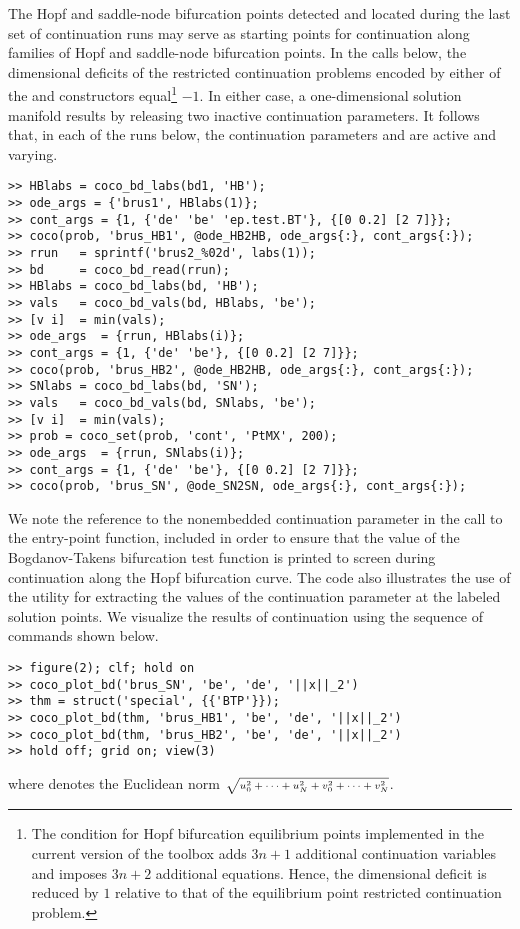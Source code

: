 The Hopf and saddle-node bifurcation points detected and located during the last set of continuation runs may serve as starting points for continuation along families of Hopf and saddle-node bifurcation points. In the calls below, the dimensional deficits of the restricted continuation problems encoded by either of the  and  constructors equal\footnote{The condition for Hopf bifurcation equilibrium points implemented in the current version of the  toolbox adds $3n+1$ additional continuation variables and imposes $3n+2$ additional equations. Hence, the dimensional deficit is reduced by $1$ relative to that of the equilibrium point restricted continuation problem.} $-1$. In either case, a one-dimensional solution manifold results by releasing two inactive continuation parameters. It follows that, in each of the runs below, the continuation parameters  and  are active and varying.
\begin{lstlisting}[language=coco-highlight]
>> HBlabs = coco_bd_labs(bd1, 'HB');
>> ode_args = {'brus1', HBlabs(1)};
>> cont_args = {1, {'de' 'be' 'ep.test.BT'}, {[0 0.2] [2 7]}};
>> coco(prob, 'brus_HB1', @ode_HB2HB, ode_args{:}, cont_args{:});
>> rrun   = sprintf('brus2_%02d', labs(1));
>> bd     = coco_bd_read(rrun);
>> HBlabs = coco_bd_labs(bd, 'HB');
>> vals   = coco_bd_vals(bd, HBlabs, 'be');
>> [v i]  = min(vals);
>> ode_args  = {rrun, HBlabs(i)};
>> cont_args = {1, {'de' 'be'}, {[0 0.2] [2 7]}};
>> coco(prob, 'brus_HB2', @ode_HB2HB, ode_args{:}, cont_args{:});
>> SNlabs = coco_bd_labs(bd, 'SN');
>> vals   = coco_bd_vals(bd, SNlabs, 'be');
>> [v i]  = min(vals);
>> prob = coco_set(prob, 'cont', 'PtMX', 200);
>> ode_args  = {rrun, SNlabs(i)};
>> cont_args = {1, {'de' 'be'}, {[0 0.2] [2 7]}};
>> coco(prob, 'brus_SN', @ode_SN2SN, ode_args{:}, cont_args{:});
\end{lstlisting}
We note the reference to the  nonembedded continuation parameter in the call to the  entry-point function, included in order to ensure that the value of the Bogdanov-Takens bifurcation test function is printed to screen during continuation along the Hopf bifurcation curve. The code also illustrates the use of the  utility for extracting the values of the continuation parameter  at the labeled solution points. We visualize the results of continuation using the sequence of commands shown below.
\begin{lstlisting}[language=coco-highlight]
>> figure(2); clf; hold on
>> coco_plot_bd('brus_SN', 'be', 'de', '||x||_2')
>> thm = struct('special', {{'BTP'}});
>> coco_plot_bd(thm, 'brus_HB1', 'be', 'de', '||x||_2')
>> coco_plot_bd(thm, 'brus_HB2', 'be', 'de', '||x||_2')
>> hold off; grid on; view(3)
\end{lstlisting}
where  denotes the Euclidean norm $\mbox{\scriptsize$\sqrt{u_0^2+\cdots+u_N^2+v_0^2+\cdots+v_N^2}$}$.\\
\medskip

